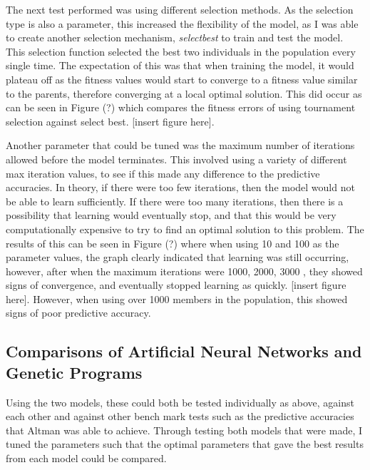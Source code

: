 \documentclass[11pt]{article}
\begin{document}
The next test performed was using different selection methods. As the selection type is also a parameter, this increased the flexibility of the model, as I was able to create another selection mechanism, \textit{select\textunderscore best} to train and test the model. This selection function selected the best two individuals in the population every single time. The expectation of this was that when training the model, it would plateau off as the fitness values would start to converge to a fitness value similar to the parents, therefore converging at a local optimal solution. This did occur as can be seen in Figure (?)  which compares the fitness errors of using tournament selection against select best. [insert figure here].

Another parameter that could be tuned was the maximum number of iterations allowed before the model terminates. This involved using a variety of different max iteration values, to see if this made any difference to the predictive accuracies. In theory, if there were too few iterations, then the model would not be able to learn sufficiently. If there were too many iterations, then there is a possibility that learning would eventually stop, and that this would be very computationally expensive to try to find an optimal solution to this problem. The results of this can be seen in Figure (?) where when using 10 and 100 as the parameter values, the graph clearly indicated that learning was still occurring, however, after when the maximum iterations were 1000, 2000, 3000 , they showed signs of convergence, and eventually stopped learning as quickly. [insert figure here]. However, when using over 1000 members in the population, this showed signs of poor predictive  accuracy.

\subsection{Comparisons of Artificial Neural Networks and Genetic Programs}
Using the two models, these could both be tested individually as above, against each other and against other bench mark tests such as the predictive accuracies that Altman was able to achieve. 
Through testing both models that were made, I tuned the parameters such that the optimal parameters that gave the best results from each model could be compared. 



\end{document}
